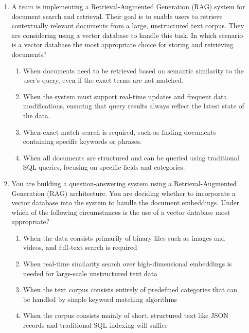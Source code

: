 \begin{enumerate}[resume,leftmargin=*]
\begin{enumerate}[label=\Alph*.]
  \item Use a version control system like Git to track prompt changes and synchronize the latest version with the deployment environment.
\end{enumerate}
\item A team is implementing a Retrieval-Augmented Generation (RAG) system for document search and retrieval. Their goal is to enable users to retrieve contextually relevant documents from a large, unstructured text corpus. They are considering using a vector database to handle this task. In which scenario is a vector database the most appropriate choice for storing and retrieving documents?
\begin{enumerate}[label=\Alph*.]
  \item When documents need to be retrieved based on semantic similarity to the user's query, even if the exact terms are not matched.
  \item When the system must support real-time updates and frequent data modifications, ensuring that query results always reflect the latest state of the data.
  \item When exact match search is required, such as finding documents containing specific keywords or phrases.
  \item When all documents are structured and can be queried using traditional SQL queries, focusing on specific fields and categories.
\end{enumerate}
\item You are building a question-answering system using a Retrieval-Augmented Generation (RAG) architecture. You are deciding whether to incorporate a vector database into the system to handle the document embeddings. Under which of the following circumstances is the use of a vector database most appropriate?
\begin{enumerate}[label=\Alph*.]
  \item When the data consists primarily of binary files such as images and videos, and full-text search is required
  \item When real-time similarity search over high-dimensional embeddings is needed for large-scale unstructured text data
  \item When the text corpus consists entirely of predefined categories that can be handled by simple keyword matching algorithms
  \item When the corpus consists mainly of short, structured text like JSON records and traditional SQL indexing will suffice
\end{enumerate}

\end{enumerate}
